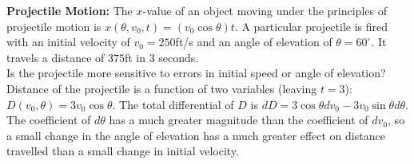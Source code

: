 {\textbf{Projectile Motion:} The $x$-value of an object moving under the principles of projectile motion is $x(\theta,v_0,t)= (v_0\cos\theta)t$. A particular projectile is fired with an initial velocity of $v_0=250$ft/s and an angle of elevation of $\theta = 60^\circ$. It travels a distance of $375$ft in 3 seconds.\\

Is the projectile more sensitive to errors in initial speed or angle of elevation?
}
{Distance of the projectile is a function of two variables (leaving $t=3$): $D(v_0,\theta) = 3v_0\cos\theta$. The total differential of $D$ is $dD = 3\cos\theta dv_0-3v_0\sin\theta d\theta$. The coefficient of $d\theta$ has a much greater magnitude than the coefficient of $dv_0$, so a small change in the angle of elevation has a much greater effect on distance travelled than a small change in initial velocity.
}